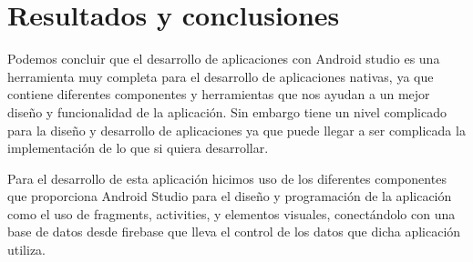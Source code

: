 \chapter{Resultados y conclusiones}


Podemos concluir que el desarrollo de aplicaciones con Android studio es una herramienta muy completa para el desarrollo de aplicaciones nativas, ya que contiene diferentes componentes y herramientas que nos ayudan a un mejor diseño y funcionalidad de la aplicación. Sin embargo  tiene un nivel complicado para la diseño y desarrollo de aplicaciones ya que puede llegar a ser complicada la implementación de lo que si quiera desarrollar.

Para el desarrollo de esta aplicación hicimos uso de los diferentes componentes que proporciona Android Studio para el diseño y programación de la aplicación como el uso de fragments, activities, y elementos visuales, conectándolo con una base de datos desde firebase que lleva el control de los datos que dicha aplicación utiliza.
